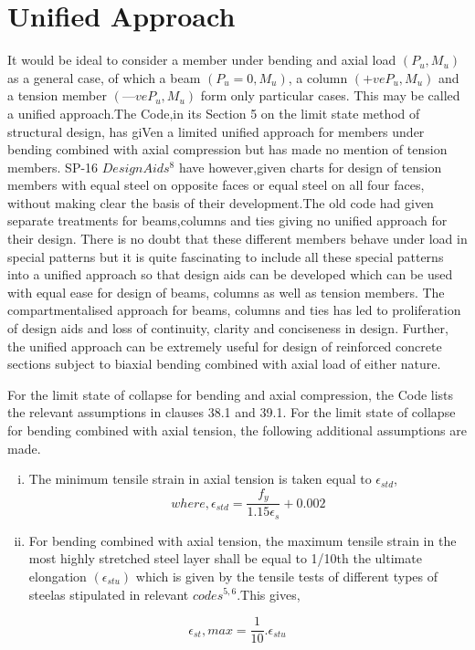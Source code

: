\section{Unified Approach}

It would be ideal to consider a member under bending and axial load
$(P_u, M_u)$ as a general case, of which a beam $(P_u=0,M_u)$, a column
$(+ve P_u,M_u)$ and a tension member $(—ve P_u,M_u)$ form only particular
cases. This may be called a uniﬁed approach.The Code,in its Section 5 on
the limit state method of structural design, has giVen a limited uniﬁed
approach for members under bending combined with axial compression but
has made no mention of tension members. SP-16 $Design Aids^8$ have
however,given charts for design of tension members with equal steel on
opposite faces or equal steel on all four faces, without making clear the
basis of their development.The old code had given separate treatments for
beams,columns and ties giving no uniﬁed approach for their design. There
is no doubt that these different members behave under load in special
patterns but it is quite fascinating to include all these special
patterns into a uniﬁed approach so that design aids can be developed
which can be used with equal ease for design of beams, columns as well 
as tension members. The compartmentalised approach for beams, columns
and ties has led to proliferation of design aids and loss of continuity,
clarity and conciseness in design. Further, the uniﬁed approach can be
extremely useful for design of reinforced concrete sections subject to
biaxial bending combined with axial load of either nature.

For the limit state of collapse for bending and axial compression, the
Code lists the relevant assumptions in clauses 38.1 and 39.1. For the
limit state of collapse for bending combined with axial tension, the
following additional assumptions are made.

\begin{enumerate}[(i)]
\item The minimum tensile strain in axial tension is taken equal to $\epsilon_{std}$,
\begin{equation}
where, 
\epsilon_{std}=\frac{f_y}{1.15{\epsilon_s}}+0.002
\end{equation}
\item  For bending combined with axial tension, the maximum tensile
strain in the most highly stretched steel layer shall be equal to 1/10th
the ultimate elongation $(\epsilon_{stu})$ which is given by the tensile
tests of different types of steelas stipulated in relevant
$codes^{5,6}$.This gives,
\end{enumerate}
\begin{equation}
\epsilon_{st},max=\frac{1}{10}.\epsilon_{stu}
\end{equation}

